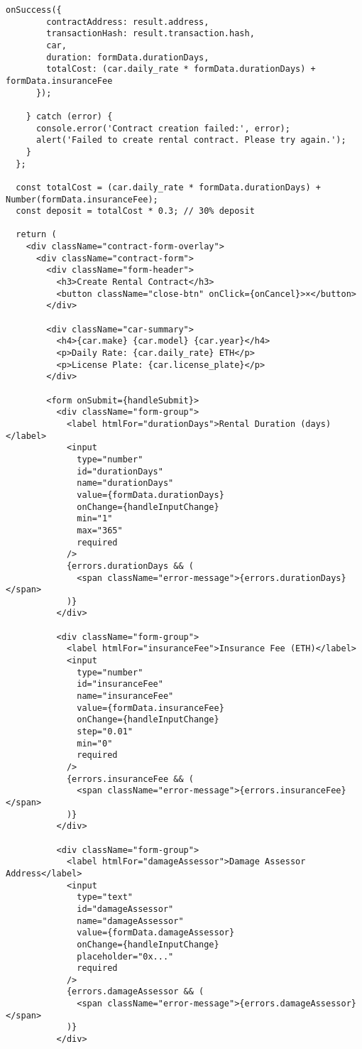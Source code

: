 \documentclass[12pt,a4paper]{article}
\begin{document}
\begin{lstlisting}[caption=ContractForm Component]
      onSuccess({
        contractAddress: result.address,
        transactionHash: result.transaction.hash,
        car,
        duration: formData.durationDays,
        totalCost: (car.daily_rate * formData.durationDays) + formData.insuranceFee
      });

    } catch (error) {
      console.error('Contract creation failed:', error);
      alert('Failed to create rental contract. Please try again.');
    }
  };

  const totalCost = (car.daily_rate * formData.durationDays) + Number(formData.insuranceFee);
  const deposit = totalCost * 0.3; // 30% deposit

  return (
    <div className="contract-form-overlay">
      <div className="contract-form">
        <div className="form-header">
          <h3>Create Rental Contract</h3>
          <button className="close-btn" onClick={onCancel}>×</button>
        </div>

        <div className="car-summary">
          <h4>{car.make} {car.model} {car.year}</h4>
          <p>Daily Rate: {car.daily_rate} ETH</p>
          <p>License Plate: {car.license_plate}</p>
        </div>

        <form onSubmit={handleSubmit}>
          <div className="form-group">
            <label htmlFor="durationDays">Rental Duration (days)</label>
            <input
              type="number"
              id="durationDays"
              name="durationDays"
              value={formData.durationDays}
              onChange={handleInputChange}
              min="1"
              max="365"
              required
            />
            {errors.durationDays && (
              <span className="error-message">{errors.durationDays}</span>
            )}
          </div>

          <div className="form-group">
            <label htmlFor="insuranceFee">Insurance Fee (ETH)</label>
            <input
              type="number"
              id="insuranceFee"
              name="insuranceFee"
              value={formData.insuranceFee}
              onChange={handleInputChange}
              step="0.01"
              min="0"
              required
            />
            {errors.insuranceFee && (
              <span className="error-message">{errors.insuranceFee}</span>
            )}
          </div>

          <div className="form-group">
            <label htmlFor="damageAssessor">Damage Assessor Address</label>
            <input
              type="text"
              id="damageAssessor"
              name="damageAssessor"
              value={formData.damageAssessor}
              onChange={handleInputChange}
              placeholder="0x..."
              required
            />
            {errors.damageAssessor && (
              <span className="error-message">{errors.damageAssessor}</span>
            )}
          </div>


\end{lstlisting}
\end{document}
